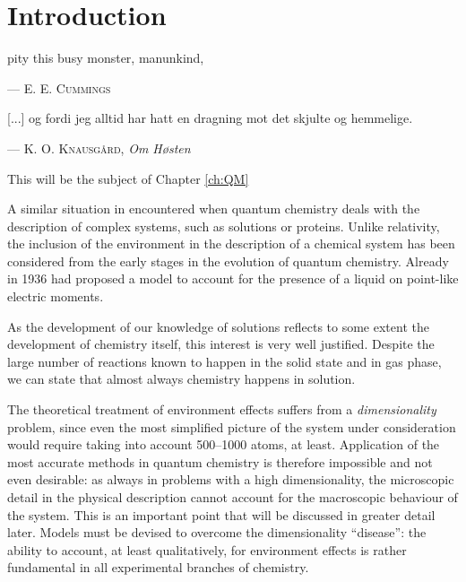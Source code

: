 \chapter*{Introduction}

\epigraph{
pity this busy monster, manunkind,
    }{
    --- \textsc{E. E. Cummings}}

\epigraph{
[...] og fordi jeg alltid har hatt en dragning mot det skjulte og hemmelige.
    }{
    --- \textsc{K. O. Knausgård}, \textit{Om Høsten}}

This will be the subject of Chapter \ref{ch:QM}

A similar situation in encountered when quantum chemistry deals with the
description of complex systems, such as solutions or proteins. Unlike
relativity, the inclusion of the environment in the description of a
chemical system has been considered from the early stages in the
evolution of quantum chemistry.
Already in 1936 \citeauthor{Onsager1936-wf} had proposed a model to
account for the presence of a liquid on point-like electric
moments.~\autocite{Onsager1936-wf}

As the development of our knowledge of solutions reflects to some extent
the development of chemistry itself, this interest is very well
justified.
Despite the large number of reactions known to happen in the solid state
and in gas phase, we can state that almost always chemistry happens in
solution.~\autocite{Reichardt2010-le}

The theoretical treatment of environment effects suffers from a
\emph{dimensionality} problem, since even the most simplified picture of
the system under consideration would require taking into account
500--1000 atoms, at least. Application of the most accurate methods in
quantum chemistry is therefore impossible and not even desirable: as
always in problems with a high dimensionality, the microscopic detail in
the physical description cannot account for the macroscopic behaviour of
the system. This is an important point that will be discussed in greater
detail later.
Models must be devised to overcome the dimensionality ``disease'': the
ability to account, at least qualitatively, for environment effects is
rather fundamental in all experimental branches of
chemistry.~\autocite{Anderson1972-ai, Winsberg2010-sy, Kovac2011-ew}

